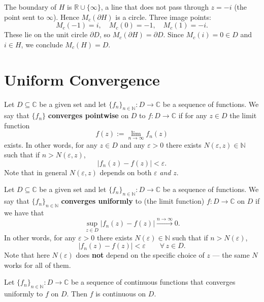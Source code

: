 \documentclass[11pt, a4paper]{article}
\begin{document}
\begin{exbox}
The boundary of $H$ is $\mathbb{R}\cup\{\infty\}$, a line that does not pass through $z=-i$ (the point sent to $\infty$). Hence $M_c(\partial H)$ is a circle. Three image points:
\[
  M_c(-1)=i, \quad M_c(0)=-1, \quad M_c(1)=-i.
\]
These lie on the unit circle $\partial D$, so $M_c(\partial H)=\partial D$. Since $M_c(i)=0\in D$ and $i\in H$, we conclude $M_c(H)=D$.
\end{exbox}


\newpage
\section{Uniform Convergence}

\begin{defbox}
Let $D\subseteq\mathbb{C}$ be a given set and let $\{f_n\}_{n\in\mathbb{N}}:D\to\mathbb{C}$ be a sequence of functions. We say that $\{f_n\}$ \textbf{converges pointwise} on $D$ to $f:D\to\mathbb{C}$ if for any $z\in D$ the limit function
\[
  f(z):=\lim_{n\to\infty}f_n(z)
\]
exists. In other words, for any $z\in D$ and any $\varepsilon>0$ there exists $N(\varepsilon,z)\in\mathbb{N}$ such that if $n>N(\varepsilon,z)$,
\[
  |f_n(z)-f(z)|<\varepsilon.
\]
Note that in general $N(\varepsilon,z)$ depends on both $\varepsilon$ \emph{and} $z$.
\end{defbox}

\begin{defbox}
Let $D\subseteq\mathbb{C}$ be a given set and let $\{f_n\}_{n\in\mathbb{N}}:D\to\mathbb{C}$ be a sequence of functions. We say that $\{f_n\}_{n\in\mathbb{N}}$ \textbf{converges uniformly} to (the limit function) $f:D\to\mathbb{C}$ on $D$ if we have that
\[
  \sup_{z\in D}|f_n(z)-f(z)|\xrightarrow{n\to\infty}0.
\]
In other words, for any $\varepsilon>0$ there exists $N(\varepsilon)\in\mathbb{N}$ such that if $n>N(\varepsilon)$,
\[
  |f_n(z)-f(z)|<\varepsilon \qquad \forall\, z\in D.
\]
Note that here $N(\varepsilon)$ does \textbf{not} depend on the specific choice of $z$ --- the same $N$ works for all of them.
\end{defbox}

\begin{thmbox}
Let $\{f_n\}_{n\in\mathbb{N}}:D\to\mathbb{C}$ be a sequence of continuous functions that converges uniformly to $f$ on $D$. Then $f$ is continuous on $D$.
\end{thmbox}
\end{document}
